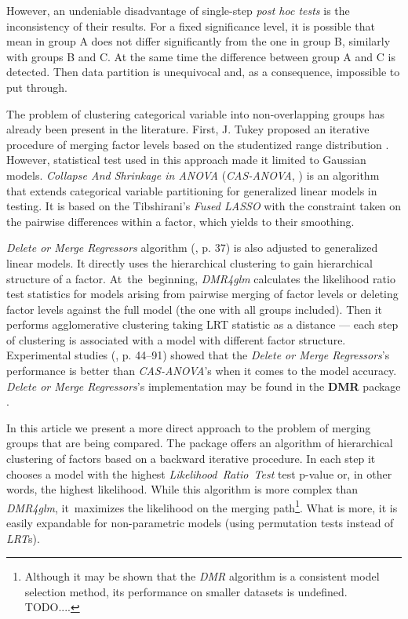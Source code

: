 However, an undeniable disadvantage of single-step \emph{post hoc tests} is the inconsistency of their results. For a fixed significance level, it is possible that mean in group A does not differ significantly from the one in group B, similarly with groups B and C. At the same time the difference between group A and C is detected. Then data partition is unequivocal and, as a consequence, impossible to put through. 

The problem of clustering categorical variable into non-overlapping groups has already been present in the literature. First, J. Tukey proposed an iterative procedure of merging factor levels based on the studentized range distribution \citep{Tukey}. However, statistical test used in this approach made it limited to Gaussian models. \emph{Collapse And Shrinkage in ANOVA} (\emph{CAS-ANOVA}, \citealp{Casanova}) is an algorithm that extends categorical variable partitioning for generalized linear models in testing. It is based on the Tibshirani's \emph{Fused LASSO} \citep{Tib} with the constraint taken on the pairwise differences within a factor, which yields to their smoothing.

\emph{Delete or Merge Regressors} algorithm (\citealp{Proch}, p. 37) is also adjusted to generalized linear models. It directly uses the hierarchical clustering to gain hierarchical structure of a factor. At~the~beginning, \emph{DMR4glm} calculates the likelihood ratio test statistics for models arising from pairwise merging of factor levels or deleting factor levels against the full model (the one with all groups included). Then it performs agglomerative clustering taking LRT statistic as a distance --- each step of clustering is associated with a model with different factor structure. Experimental studies (\citealp{Proch}, p. 44--91) showed that the \emph{Delete or Merge Regressors}'s performance is better than \emph{CAS-ANOVA}'s when it comes to the model accuracy. \emph{Delete or Merge Regressors}'s implementation may be found in the \textbf{DMR} package \citep{DMR}.

In this article we present a more direct approach to the problem of merging groups that are being compared. The \factorMerger package offers an algorithm of hierarchical clustering of factors based on a backward iterative procedure. In each step it chooses a model with the highest \emph{Likelihood~Ratio~Test} test p-value or, in other words, the highest likelihood. While this algorithm is more complex than \emph{DMR4glm}, it~maximizes the likelihood on the merging path\footnote{Although it may be shown that the \emph{DMR} algorithm is a consistent
model selection method, its performance on smaller datasets is undefined. TODO....}. What is more, it is easily expandable for non-parametric models (using permutation tests instead of \emph{LRT}s). 

